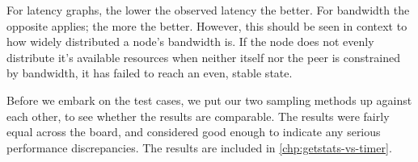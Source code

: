 For latency graphs, the lower the observed latency the better. For bandwidth the opposite applies; the more the better. However, this should be seen in context to how widely distributed a node's bandwidth is. If the node does not evenly distribute it's available resources when neither itself nor the peer is constrained by bandwidth, it has failed to reach an even, stable state.

Before we embark on the test cases, we put our two sampling methods up against each other, to see whether the results are comparable. The results were fairly equal across the board, and considered good enough to indicate any serious performance discrepancies. The results are included in \autoref{chp:getstats-vs-timer}.






